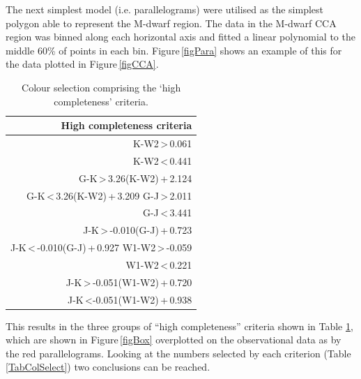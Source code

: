 The next simplest model (i.e. parallelograms) were utilised as the simplest polygon able to represent the M-dwarf region. The data in the M-dwarf CCA region was binned along each horizontal axis and fitted a linear polynomial to the middle 60\% of points in each bin. Figure\,\ref{figPara} shows an example of this for the data plotted in Figure\,\ref{figCCA}.\\

\begin{table}[]
    \centering
    \begin{tabular}{|r|}
        \hline
        High completeness criteria\\
        \hline
        K-W2\,\textgreater\,0.061\\
        K-W2\,\textless\,0.441\\
        G-K\,\textgreater\,3.26(K-W2)\,+\,2.124\\
        G-K\,\textless\,3.26(K-W2)\,+\,3.209
        G-J\,\textgreater\,2.011\\
        G-J\,\textless\,3.441\\
        J-K\,\textgreater\,-0.010(G-J)\,+\,0.723\\
        J-K\,\textless\,-0.010(G-J)\,+\,0.927
	    W1-W2\,\textgreater\,-0.059\\
        W1-W2\,\textless\,0.221\\
        J-K\,\textgreater\,-0.051(W1-W2)\,+\,0.720\\
        J-K\,\textless -0.051(W1-W2)\,+\,0.938\\
        \hline
    \end{tabular}
    \caption{Colour selection comprising the `high completeness' criteria.}
    \label{eqHC}
\end{table}

This results in the three groups of ``high completeness'' criteria shown in Table \ref{eqHC}, which are shown in Figure\,\ref{figBox} overplotted on the observational data as by the red parallelograms. Looking at the numbers selected by each criterion (Table\,\ref{TabColSelect}) two conclusions can be reached.\\

